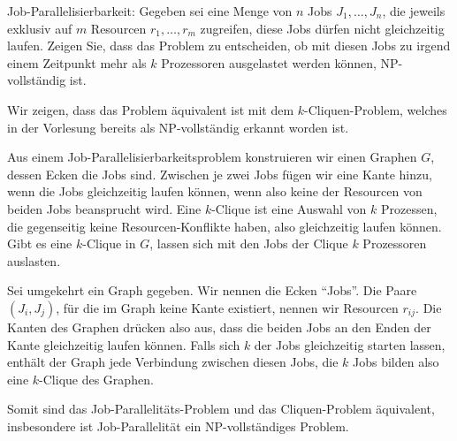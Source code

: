 Job-Parallelisierbarkeit:
Gegeben sei eine Menge von $n$ Jobs $J_1,\dots,J_n$, die jeweils exklusiv
auf $m$ Resourcen $r_1,\dots,r_m$ zugreifen, diese Jobs dürfen
nicht gleichzeitig laufen. Zeigen Sie, dass das Problem zu entscheiden,
ob mit diesen Jobs zu irgend einem Zeitpunkt mehr als $k$ Prozessoren
ausgelastet werden können, NP-vollständig ist.


\begin{loesung}
Wir zeigen, dass das Problem äquivalent ist mit dem $k$-Cliquen-Problem,
welches in der Vorlesung bereits als NP-vollständig erkannt worden ist.

Aus einem Job-Parallelisierbarkeitsproblem konstruieren wir einen Graphen $G$,
dessen Ecken die Jobs sind. Zwischen je zwei Jobs fügen wir eine
Kante hinzu, wenn die Jobs gleichzeitig laufen können, wenn also
keine der Resourcen von beiden Jobs beansprucht wird. Eine $k$-Clique
ist eine Auswahl von $k$ Prozessen, die gegenseitig keine Resourcen-Konflikte
haben, also gleichzeitig laufen können. Gibt es eine $k$-Clique in $G$,
lassen sich mit den Jobs der Clique $k$ Prozessoren auslasten.

Sei umgekehrt ein Graph gegeben. Wir nennen die Ecken ``Jobs''. Die
Paare $(J_i,J_j)$, für die im Graph keine Kante existiert,  nennen
wir Resourcen $r_{ij}$. Die Kanten des Graphen drücken also aus, dass
die beiden Jobs an den Enden der Kante gleichzeitig laufen können.
Falls sich $k$ der Jobs gleichzeitig starten lassen, enthält der
Graph jede Verbindung zwischen diesen Jobs, die $k$ Jobs bilden also
eine $k$-Clique des Graphen.

Somit sind das Job-Parallelitäts-Problem und das Cliquen-Problem
äquivalent, insbesondere ist Job-Parallelität ein NP-vollständiges
Problem.
\end{loesung}
